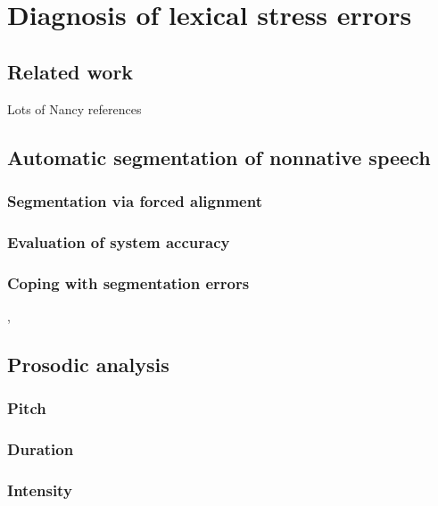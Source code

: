 %
%
\chapter{Diagnosis of lexical stress errors}
\label{chap:diagnosis}



\section{Related work}

	Lots of Nancy references
	
	\cite{Duong2011}
	
	\cite{Probst2002}

\section{Automatic segmentation of nonnative speech}
	\subsection{Segmentation via forced alignment}
	\subsection{Evaluation of system accuracy}
	\subsection{Coping with segmentation errors}
		\cite{Mesbahi2011},
		\cite{Orosanu2012}
	
\section{Prosodic analysis}
	\subsection{Pitch}
	\subsection{Duration}
	\subsection{Intensity}
	
